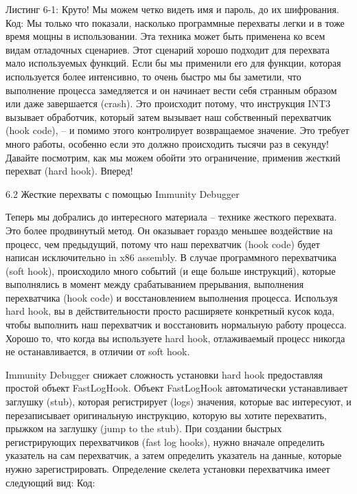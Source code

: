 \documentclass[12pt]{book}
\begin{document}
Листинг 6-1: Круто! Мы можем четко видеть имя и пароль, до их шифрования.
Код:
Мы только что показали, насколько программные перехваты легки и в тоже время мощны в использовании. Эта техника может быть применена ко всем видам отладочных сценариев. Этот сценарий хорошо подходит для перехвата мало используемых функций. Если бы мы применили его для функции, которая используется более интенсивно, то очень быстро мы бы заметили, что выполнение процесса замедляется и он начинает вести себя странным образом или даже завершается (crash). Это происходит потому, что инструкция INT3 вызывает обработчик, который затем вызывает наш собственный перехватчик (hook code), – и помимо этого контролирует возвращаемое значение. Это требует много работы, особенно если это должно происходить тысячи раз в секунду! Давайте посмотрим, как мы можем обойти это ограничение, применив жесткий перехват (hard hook). Вперед!


6.2 Жесткие перехваты с помощью Immunity Debugger

Теперь мы добрались до интересного материала – технике жесткого перехвата. Это более продвинутый метод. Он оказывает гораздо меньшее воздействие на процесс, чем предыдущий, потому что наш перехватчик (hook code) будет написан исключительно in x86 assembly. В случае программного перехватчика (soft hook), происходило много событий (и еще больше инструкций), которые выполнялись в момент между срабатыванием прерывания, выполнения перехватчика (hook code) и восстановлением выполнения процесса. Используя hard hook, вы в действительности просто расширяете конкретный кусок кода, чтобы выполнить наш перехватчик и восстановить нормальную работу процесса. Хорошо то, что когда вы используете hard hook, отлаживаемый процесс никогда не останавливается, в отличии от soft hook.

Immunity Debugger снижает сложность установки hard hook предоставляя простой объект FastLogHook. Объект FastLogHook автоматически устанавливает заглушку (stub), которая регистрирует (logs) значения, которые вас интересуют, и перезаписывает оригинальную инструкцию, которую вы хотите перехватить, прыжком на заглушку (jump to the stub). При создании быстрых регистрирующих перехватчиков (fast log hooks), нужно вначале определить указатель на сам перехватчик, а затем определить указатель на данные, которые нужно зарегистрировать. Определение скелета установки перехватчика имеет следующий вид:
Код:
\end{document}

